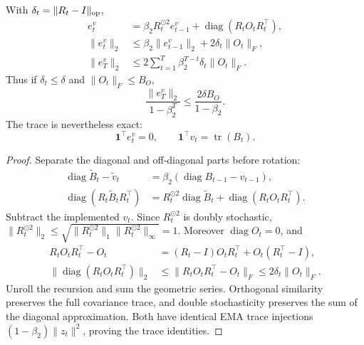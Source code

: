 \begin{proposition}
\label{prop:accumulated-covariance}
With $\delta_t=\|R_t-I\|_{\rm op}$,
\begin{align}
 e_t^v&=\beta_2R_t^{\odot2}e_{t-1}^v
                    +\operatorname{diag}(R_tO_tR_t^\top),\label{eq:diag-error-recursion}\\
 \|e_t^v\|_2&\le\beta_2\|e_{t-1}^v\|_2+2\delta_t\|O_t\|_F,\\
 \|e_T^v\|_2&\le2\sum_{t=1}^T\beta_2^{T-t}\delta_t\|O_t\|_F.
 \label{eq:diag-error-unrolled}
\end{align}
Thus if $\delta_t\le\delta$ and $\|O_t\|_F\le B_O$,
\begin{equation}
 \frac{\|e_T^v\|_2}{1-\beta_2^T}
          \le\frac{2\delta B_O}{1-\beta_2}.\label{eq:diag-error-steady}
\end{equation}
The trace is nevertheless exact:
\begin{equation}
 \mathbf1^\top e_t^v=0,\qquad
 \mathbf1^\top v_t=\operatorname{tr}(B_t).
\end{equation}
\end{proposition}
\begin{proof}
Separate the diagonal and off-diagonal parts before rotation:
\begin{align}
 \operatorname{diag}\widetilde B_t-\widetilde v_t
 &=\beta_2(\operatorname{diag}B_{t-1}-v_{t-1}),\\
 \operatorname{diag}(R_t\widetilde B_tR_t^\top)
 &=R_t^{\odot2}\operatorname{diag}\widetilde B_t
                          +\operatorname{diag}(R_tO_tR_t^\top).
\end{align}
Subtract the implemented $v_t$. Since $R_t^{\odot2}$ is doubly stochastic,
$\|R_t^{\odot2}\|_2\le
\sqrt{\|R_t^{\odot2}\|_1\|R_t^{\odot2}\|_\infty}=1$.
Moreover $\operatorname{diag}O_t=0$, and
\begin{align}
 R_tO_tR_t^\top-O_t
 &=(R_t-I)O_tR_t^\top+O_t(R_t^\top-I),\\
 \|\operatorname{diag}(R_tO_tR_t^\top)\|_2
 &\le\|R_tO_tR_t^\top-O_t\|_F
 \le2\delta_t\|O_t\|_F.
\end{align}
Unroll the recursion and sum the geometric series. Orthogonal similarity
preserves the full covariance trace, and double stochasticity preserves
the sum of the diagonal approximation. Both have identical EMA trace
injections $(1-\beta_2)\|z_t\|^2$, proving the trace identities.
\end{proof}

